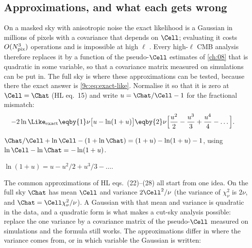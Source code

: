 \subsection{Approximations, and what each gets wrong}
\label{9c:sec:cl-approx}

On a masked sky with anisotropic noise the exact likelihood is a Gaussian in millions of pixels with a
covariance that depends on $\Cell$; evaluating it costs $O(N_{\rm pix}^3)$ operations and is impossible at
high $\ell$ . Every high-$\ell$ CMB analysis therefore replaces it by a function
of the pseudo-$\Cell$ estimates of \cref{ch:08} that is quadratic in some variable, so that a covariance
matrix measured on simulations can be put in. The full sky is where these approximations can be tested,
because there the exact answer is \eqref{9c:eq:exact-like}. Normalise it so that it is zero at
$\Cell=\Chat$ (HL eq.~15) and write $u=\Chat/\Cell-1$ for the fractional mismatch:
\begin{align}
  -2\ln\Like_{\rm exact}
  &\eqby{1}\nu\bigl[u-\ln(1+u)\bigr]
   \eqby{2}\nu\Bigl[\frac{u^2}{2}-\frac{u^3}{3}+\frac{u^4}{4}-\dots\Bigr].
  \label{9c:eq:exact-u}
\end{align}
\begin{explain}
  \item $\Chat/\Cell+\ln\Cell-(1+\ln\Chat)=(1+u)-\ln(1+u)-1$, using $\ln\Cell-\ln\Chat=-\ln(1+u)$.
  \item $\ln(1+u)=u-u^2/2+u^3/3-\dots$.
\end{explain}
The common approximations of HL eqs.~(22)--(28) all start from one idea. On the full sky $\Chat$ has mean
$\Cell$ and variance $2\Cell^2/\nu$ (the variance of $\chi^2_\nu$ is $2\nu$, and $\Chat=\Cell\chi^2_\nu/\nu$). A
Gaussian with that mean and variance is quadratic in the data, and a quadratic form is what makes a
cut-sky analysis possible: replace the one variance by a covariance matrix of the pseudo-$\Cell$ measured on
simulations and the formula still works. The approximations differ in where the variance comes from, or in
which variable the Gaussian is written:
